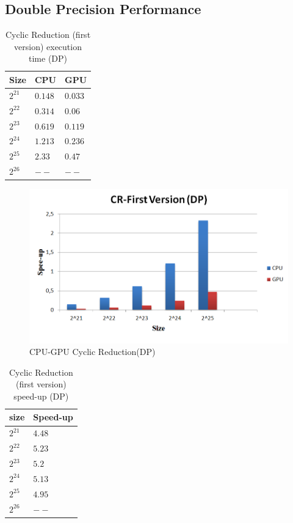\subsection{Double Precision Performance}


\begin{table}[H]
\caption{Cyclic Reduction (first version) execution time (DP)} 
\centering 
\begin{tabular}{| l | p{3cm} | p{3cm} |} 
\hline\hline 
Size & CPU & GPU  \\ [0.8ex] 
\hline 
        $2^{21}$ & $0.148$& $0.033$ \\ 	
        $2^{22}$ & $0.314$& $0.06$  \\ 	
        $2^{23}$ & $0.619$& $0.119$ \\ 
        $2^{24}$ & $1.213$& $0.236$ \\ 
        $2^{25}$ & $2.33$& $0.47$  \\ 
        $2^{26}$ & $--$& $--$      \\ [1ex]
\hline 
\end{tabular}
\label{table:cr_first_double} 
\end{table}

\begin{figure}[H]
   \centering
       \includegraphics[width=1\textwidth]{grafhmata/cr_first_dp.png}
   \caption{CPU-GPU Cyclic Reduction(DP)}
   \label{fig:CPU-GPU Cyclic Reduction(DP)}
\end{figure}

\begin{table}[H]
\caption{Cyclic Reduction (first version) speed-up (DP)} 
\centering 
\begin{tabular}{| l | p{3cm} |} 
\hline\hline 
size	 & Speed-up  \\  [0.8ex] 
\hline        
        $2^{21}$ & $4.48$      \\	
        $2^{22}$ & $5.23$     \\
        $2^{23}$ & $5.2$      \\ 
        $2^{24}$ & $5.13$    \\ 
        $2^{25}$ & $4.95$     \\ 
        $2^{26}$ & $--$       \\ [1ex]
        \hline
\end{tabular}
\label{table:cr_first_double_spup} 
\end{table}

